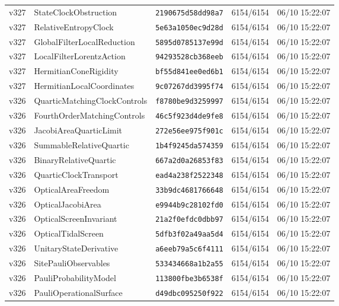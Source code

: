 \documentclass[11pt]{article}
\theoremstyle{definition}\newtheorem{deriv}{Derivação}
\begin{document}
{\begin{longtable}{@{}lllll@{}}
v327 & StateClockObstruction & \texttt{2190675d58dd98a7} & 6154/6154 & 06/10 15:22:07 \\
v327 & RelativeEntropyClock & \texttt{5e63a1050ec9d28d} & 6154/6154 & 06/10 15:22:07 \\
v327 & GlobalFilterLocalReduction & \texttt{5895d0785137e99d} & 6154/6154 & 06/10 15:22:07 \\
v327 & LocalFilterLorentzAction & \texttt{94293528cb368eeb} & 6154/6154 & 06/10 15:22:07 \\
v327 & HermitianConeRigidity & \texttt{bf55d841ee0ed6b1} & 6154/6154 & 06/10 15:22:07 \\
v327 & HermitianLocalCoordinates & \texttt{9c07267dd3995f74} & 6154/6154 & 06/10 15:22:07 \\
v326 & QuarticMatchingClockControls & \texttt{f8780be9d3259997} & 6154/6154 & 06/10 15:22:07 \\
v326 & FourthOrderMatchingControls & \texttt{46c5f923d4de9fe8} & 6154/6154 & 06/10 15:22:07 \\
v326 & JacobiAreaQuarticLimit & \texttt{272e56ee975f901c} & 6154/6154 & 06/10 15:22:07 \\
v326 & SummableRelativeQuartic & \texttt{1b4f9245da574359} & 6154/6154 & 06/10 15:22:07 \\
v326 & BinaryRelativeQuartic & \texttt{667a2d0a26853f83} & 6154/6154 & 06/10 15:22:07 \\
v326 & QuarticClockTransport & \texttt{ead4a238f2522348} & 6154/6154 & 06/10 15:22:07 \\
v326 & OpticalAreaFreedom & \texttt{33b9dc4681766648} & 6154/6154 & 06/10 15:22:07 \\
v326 & OpticalJacobiArea & \texttt{e9944b9c28102fd0} & 6154/6154 & 06/10 15:22:07 \\
v326 & OpticalScreenInvariant & \texttt{21a2f0efdc0dbb97} & 6154/6154 & 06/10 15:22:07 \\
v326 & OpticalTidalScreen & \texttt{5dfb3f02a49aa5d4} & 6154/6154 & 06/10 15:22:07 \\
v326 & UnitaryStateDerivative & \texttt{a6eeb79a5c6f4111} & 6154/6154 & 06/10 15:22:07 \\
v326 & SitePauliObservables & \texttt{533434668a1b2a55} & 6154/6154 & 06/10 15:22:07 \\
v326 & PauliProbabilityModel & \texttt{113800fbe3b6538f} & 6154/6154 & 06/10 15:22:07 \\
v326 & PauliOperationalSurface & \texttt{d49dbc095250f922} & 6154/6154 & 06/10 15:22:07 \\

\end{longtable}}
\end{document}
